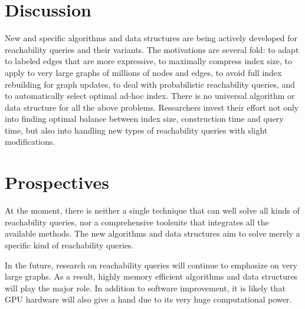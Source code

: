\documentclass[12pt,conference,compsocconf]{../IEEEtran}
\begin{document}
\section{Discussion}

New and specific algorithms and data structures are being actively developed for reachability queries and their variants. The motivations are several fold: to adapt to labeled edges that are more expressive, to maximally compress index size, to apply to very large graphs of millions of nodes and edges, to avoid full index rebuilding for graph updates, to deal with probabilistic reachability queries, and to automatically select optimal ad-hoc index. There is no universal algorithm or data structure for all the above problems. Researchers invest their effort not only into finding optimal balance between index size, construction time and query time, but also into handling new types of reachability queries with slight modifications.

\section{Prospectives}

At the moment, there is neither a single technique that can well solve all kinds of reachability queries, nor a comprehensive toolsuite that integrates all the available methods. The new algorithms and data structures aim to solve merely a specific kind of reachability queries.

In the future, research on reachability queries will continue to emphasize on very large graphs. As a result, highly memory efficient algorithms and data structures will play the major role. In addition to software improvement, it is likely that GPU hardware will also give a hand due to its very huge computational power.



\end{document}

